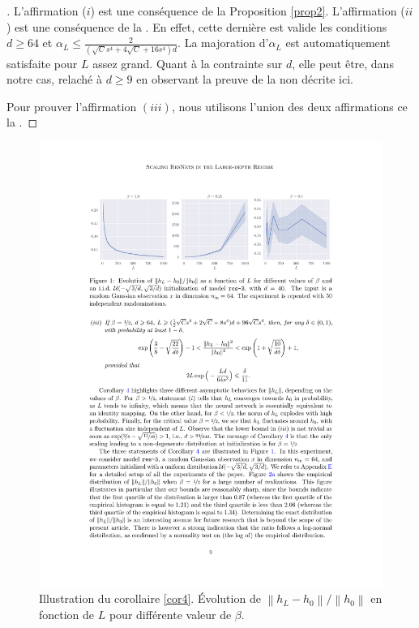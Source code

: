 \begin{proof}[]
    L'affirmation ($ i $) est une conséquence de la Proposition \ref{prop2}.
    L'affirmation ($ ii $) est une conséquence de la . En effet, cette dernière est valide les conditions $ d \geq 64 $ et $ \alpha _L \leq \frac{2}{(\sqrt{C} s^4 + 4 \sqrt{C} + 16s^4)d} $. La majoration d'$ \alpha _L $ est automatiquement satisfaite pour $ L $ assez grand. Quant à la contrainte sur $ d $, elle peut être, dans notre cas, relaché à $ d \geq 9 $ en observant la preuve de la  non décrite ici.

    Pour prouver l'affirmation $ (iii) $, nous utilisons l'union des deux affirmations ce la .
\end{proof}

\begin{figure}[H]
    \centering
    \includegraphics[width=.95\textwidth]{figs/figure_cor4.pdf}
    \caption{Illustration du corollaire \ref{cor4}. Évolution de $ \left\| h_L - h_0 \right\| / \left\| h_0 \right\| $ en fonction de $ L $ pour différente valeur de $ \beta  $.}
    \label{fig:cor4}
\end{figure}

